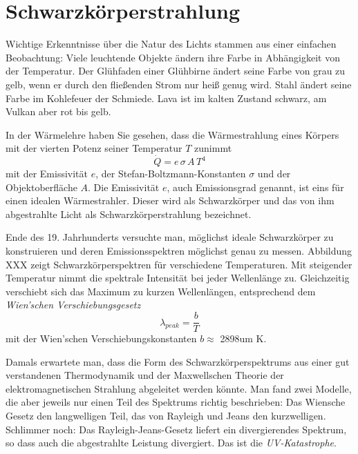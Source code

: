 \section{Schwarzkörperstrahlung}

Wichtige Erkenntnisse über die Natur des Lichts stammen aus einer einfachen Beobachtung: Viele leuchtende Objekte ändern ihre Farbe in Abhängigkeit von der Temperatur. Der Glühfaden einer Glühbirne ändert seine Farbe von grau zu gelb, wenn er durch den fließenden Strom nur heiß genug wird. Stahl ändert seine Farbe im Kohlefeuer der Schmiede. Lava ist im kalten Zustand schwarz, am Vulkan aber rot bis gelb.

In der Wärmelehre haben Sie gesehen, dass die Wärmestrahlung eines Körpers mit der vierten Potenz seiner Temperatur $T$ zunimmt
\begin{equation}
    \dot{Q} = e \, \sigma \, A \, T^4
\end{equation}
mit der Emissivität $e$, der Stefan-Boltzmann-Konstanten $\sigma$ und der Objektoberfläche $A$. Die Emissivität $e$, auch Emissionsgrad genannt, ist eins für einen idealen Wärmestrahler. Dieser wird als Schwarzkörper und das von ihm abgestrahlte Licht als Schwarzkörperstrahlung bezeichnet.

Ende des 19. Jahrhunderts versuchte man, möglichst ideale Schwarzkörper zu konstruieren und deren Emissionsspektren möglichst genau zu messen. Abbildung XXX zeigt Schwarzkörperspektren für verschiedene Temperaturen. Mit steigender Temperatur nimmt die spektrale Intensität bei jeder Wellenlänge zu. Gleichzeitig verschiebt sich das Maximum zu kurzen Wellenlängen, entsprechend dem \emph{Wien'schen Verschiebungsgesetz}
\begin{equation}
    \lambda_{peak} = \frac{b}{T}
\end{equation}
mit der Wien'schen Verschiebungskonstanten $b \approx $ \si{2898}{um K}.

Damals erwartete man, dass die Form des Schwarzkörperspektrums aus einer gut verstandenen Thermodynamik und der Maxwellschen Theorie der elektromagnetischen Strahlung abgeleitet werden könnte. Man fand zwei Modelle, die aber jeweils nur einen Teil des Spektrums richtig beschrieben: Das Wiensche Gesetz den langwelligen Teil, das von Rayleigh und Jeans den kurzwelligen. Schlimmer noch: Das Rayleigh-Jeans-Gesetz liefert ein divergierendes Spektrum, so dass auch die abgestrahlte Leistung divergiert. Das ist die \emph{UV-Katastrophe}.


